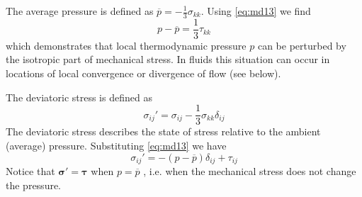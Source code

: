 
The average pressure is defined as $\overline{p} = -\frac13 \sigma_{kk}$. 
Using \eqref{eq:md13} we find 
\begin{equation}
p - \overline{p} = \frac13 \tau_{kk} 
\label{eq:md15}
\end{equation}
which demonstrates that local thermodynamic pressure $p$ can be
perturbed by the isotropic part of mechanical stress. 
In fluids this situation can occur in
locations of local convergence or divergence of flow (see below).

The deviatoric stress is defined as
\begin{equation}
\sigma_{ij}'=\sigma_{ij}-\frac13 \sigma_{kk} \delta_{ij}
\label{eq:md16}
\end{equation}
The deviatoric stress describes the state of stress relative to the ambient (average)
pressure. Substituting \eqref{eq:md13} we have
\begin{equation}
\sigma_{ij}' = -(p-\overline{p})\delta_{ij} + \tau_{ij}
\label{eq:md17}
\end{equation}
Notice that ${\bm \sigma}' = {\bm \tau}$ 
when $p = \overline{p}$ , i.e. when the mechanical stress does not change the
pressure.

\vspace{0.5cm}
\vspace{0.5cm}



\vspace{0.5cm}
\vspace{0.5cm}


